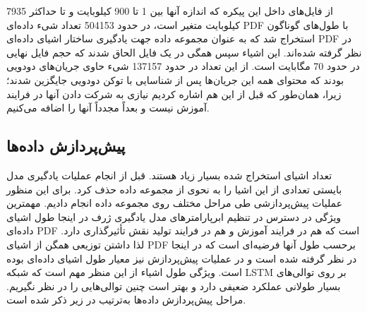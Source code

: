    
 از فایل‌های داخل این پیکره که اندازه آنها بین 1 تا 900 کیلوبایت و تا حداکثر 7935 کیلوبایت متغیر است، در حدود 504153 تعداد شیء داده‌ای \gls{PDF}  با طول‌های گوناگون استخراج شد که به عنوان مجموعه داده جهت یادگیری ساختار اشیای داده‌ای \gls{PDF} در نظر گرفته شده‌اند. این اشیاء سپس همگی در یک فایل الحاق شدند که حجم فایل نهایی در حدود 70 مگابایت است. از این تعداد در حدود 137157 شیء حاوی جریان‌های دودویی بودند که محتوای همه این جریان‌ها پس از شناسایی با توکن دودویی
   \texttt{} 
 جایگزین شدند؛ زیرا، همان‌طور که قبل از این هم اشاره کردیم نیازی به شرکت دادن آنها در فرایند آموزش نیست و بعداً مجدداً آنها را اضافه ‌می‌کنیم.
 
 
 \subsection{پیش‌پردازش داد‌ه‌ها}

 تعداد اشیای استخراج شده بسیار زیاد هستند. قبل از انجام عملیات یادگیری مدل بایستی تعدادی از این اشیا را به نحوی از مجموعه داده حذف کرد. برای این منظور عملیات پیش‌پردازشی طی مراحل مختلف روی مجموعه داده انجام دادیم. مهمترین ویژگی در دسترس در تنظیم ابرپارامترهای مدل یادگیری ژرف در اینجا طول اشیای داده‌ای  \gls{PDF} است که هم در فرایند آموزش و هم در فرایند تولید نقش تأثیرگذاری دارد. لذا داشتن توزیعی همگن از اشیای  \gls{PDF} برحسب طول آنها فرضیه‌ای است که در اینجا در نظر گرفته شده است و در عملیات پیش‌پردازش نیز معیار طول اشیای داده‌ای بوده است. ویژگی طول اشیاء از این منظر مهم است که شبکه  \gls{LSTM} بر روی توالی‌های بسیار طولانی عملکرد ضعیفی دارد و بهتر است چنین توالی‌هایی را در نظر نگیریم. مراحل پیش‌پردازش داده‌ها به‌ترتیب در زیر ذکر شده است.
 
